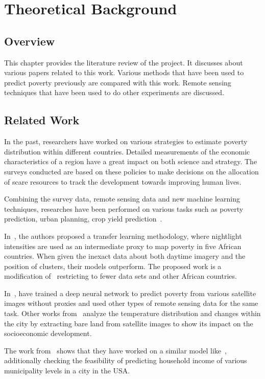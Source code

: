 \chapter{Theoretical Background}

\section{Overview}
This chapter provides the literature review of the project. It discusses about various papers related to this work. Various methods that have been used to predict poverty previously are compared with this work. Remote sensing techniques that have been used to do other experiments are discussed.

\section{Related Work}
In the past, researchers have worked on various strategies to estimate poverty distribution within different countries. Detailed measurements of the economic characteristics of a region have a great impact on both science and strategy. The surveys conducted are based on these policies to make decisions on the allocation of scare resources to track the development towards improving human lives.

Combining the survey data, remote sensing data and new machine learning techniques, researches have been performed on various tasks such as poverty prediction, urban planning, crop yield prediction~\cite{piaggesi2019predicting}. 

In~\cite{jean2016combining}, the authors proposed a transfer learning methodology, where nightlight intensities are used as an intermediate proxy to map poverty in five African countries. When given the inexact data about both daytime imagery and the position of clusters, their models outperform. The proposed work is a modification of~\cite{jean2016combining} restricting to fewer data sets and other African countries. 

In~\cite{perez2017poverty}, have trained a deep neural network to predict poverty from various satellite images without proxies and used other types of remote sensing data for the same task. Other works from~\cite{chen2006remote} analyze the temperature distribution and changes within the city by extracting bare land from satellite images to show its impact on the socioeconomic development.

The work from~\cite{piaggesi2019predicting} shows that they have worked on a similar model like~\cite{jean2016combining}, additionally checking the feasibility of predicting household income of various municipality levels in a city in the USA.

